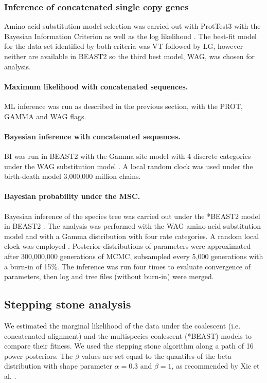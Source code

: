 \documentclass[fleqn,10pt,lineno]{wlpeerj} %
\begin{document}
\subsubsection*{Inference of concatenated single copy genes}
Amino acid substitution model selection was carried out with ProtTest3 with the Bayesian Information Criterion as well as the log likelihood \cite{darriba2011prottest,guindon2003simple}. 
The best-fit model for the data set identified by both criteria was VT followed by LG, however neither are available in BEAST2 so the third best model, WAG, was chosen for analysis. 
\paragraph*{Maximum likelihood with concatenated sequences.}
ML inference was run as described in the previous section, with the PROT, GAMMA and WAG flags.
\paragraph*{Bayesian inference with concatenated sequences.}
BI was run in BEAST2 with the Gamma site model with 4 discrete categories under the WAG substitution model \cite{whelan2001general}. A local random clock was used under the birth-death model 3,000,000 million chains.
\paragraph*{Bayesian probability under the MSC.}
Bayesian inference of the species tree was carried out under the *BEAST2 model in BEAST2 \cite{bouckaert2014beast}. 
The analysis was performed with the WAG amino acid substitution model \cite{whelan2001general} and with a Gamma distribution with four rate categories. 
A random local clock was employed \cite{drummond2010bayesian}. 
Posterior distributions of parameters were approximated after 300,000,000 generations of MCMC, subsampled every 5,000 generations with a burn-in of 15\%. 
The inference was run four times to evaluate convergence of parameters, then log and tree files (without burn-in) were merged. 


\subsection*{Stepping stone analysis}
We estimated the marginal likelihood of the data under the coalescent (i.e. concatenated alignment) and the multispecies coalescent (*BEAST) models to compare their fitness.
We used the stepping stone algorithm \citep{xie2011improving} along a path of 16 power posteriors.
The $\beta$ values are set equal to the quantiles of the beta distribution with shape parameter $\alpha=0.3$ and $\beta = 1$, as recommended by Xie et al. \cite{xie2011improving}.
\end{document}
